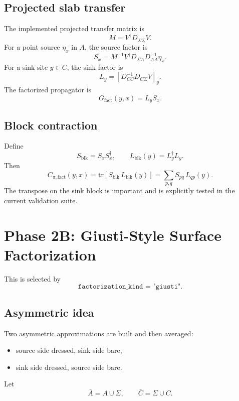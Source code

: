 \documentclass[11pt]{article}
\begin{document}
\subsection{Projected slab transfer}
The implemented projected transfer matrix is
\begin{equation}
M = V^\dagger D_{\Sigma\Sigma} V.
\end{equation}
For a point source $\eta_x$ in $A$, the source factor is
\begin{equation}
S_x = M^{-1} V^\dagger D_{\Sigma A} D_{AA}^{-1} \eta_x.
\end{equation}
For a sink site $y \in C$, the sink factor is
\begin{equation}
L_y = \left[D_{CC}^{-1} D_{C\Sigma} V\right]_y.
\end{equation}
The factorized propagator is
\begin{equation}
G_{\mathrm{fact}}(y,x)=L_y S_x.
\end{equation}

\subsection{Block contraction}
Define
\begin{equation}
S_{\mathrm{blk}} = S_x S_x^\dagger,
\qquad
L_{\mathrm{blk}}(y)=L_y^\dagger L_y.
\end{equation}
Then
\begin{equation}
C_{\pi,\mathrm{fact}}(y,x)
=
\mathrm{tr}\!\left[S_{\mathrm{blk}}\,L_{\mathrm{blk}}(y)\right]
=
\sum_{p,q} S_{pq}\,L_{qp}(y).
\end{equation}
The transpose on the sink block is important and is explicitly tested in the current
validation suite.

\section{Phase 2B: Giusti-Style Surface Factorization}
This is selected by
\begin{equation}
\texttt{factorization\_kind = "giusti"}.
\end{equation}

\subsection{Asymmetric idea}
Two asymmetric approximations are built and then averaged:
\begin{itemize}
  \item source side dressed, sink side bare,
  \item sink side dressed, source side bare.
\end{itemize}
Let
\begin{equation}
\bar A = A \cup \Sigma,
\qquad
\bar C = \Sigma \cup C.
\end{equation}
\end{document}
